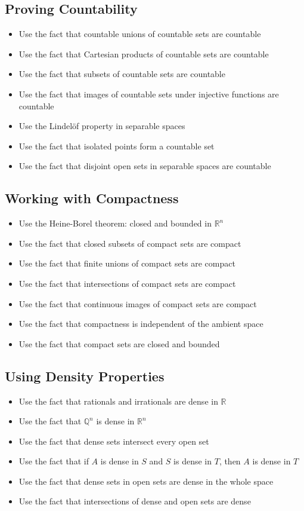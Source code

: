 \subsection*{Proving Countability}
\begin{itemize}
\item Use the fact that countable unions of countable sets are countable
\item Use the fact that Cartesian products of countable sets are countable
\item Use the fact that subsets of countable sets are countable
\item Use the fact that images of countable sets under injective functions are countable
\item Use the Lindelöf property in separable spaces
\item Use the fact that isolated points form a countable set
\item Use the fact that disjoint open sets in separable spaces are countable
\end{itemize}

\subsection*{Working with Compactness}
\begin{itemize}
\item Use the Heine-Borel theorem: closed and bounded in $\mathbb{R}^n$
\item Use the fact that closed subsets of compact sets are compact
\item Use the fact that finite unions of compact sets are compact
\item Use the fact that intersections of compact sets are compact
\item Use the fact that continuous images of compact sets are compact
\item Use the fact that compactness is independent of the ambient space
\item Use the fact that compact sets are closed and bounded
\end{itemize}

\subsection*{Using Density Properties}
\begin{itemize}
\item Use the fact that rationals and irrationals are dense in $\mathbb{R}$
\item Use the fact that $\mathbb{Q}^n$ is dense in $\mathbb{R}^n$
\item Use the fact that dense sets intersect every open set
\item Use the fact that if $A$ is dense in $S$ and $S$ is dense in $T$, then $A$ is dense in $T$
\item Use the fact that dense sets in open sets are dense in the whole space
\item Use the fact that intersections of dense and open sets are dense
\end{itemize}

